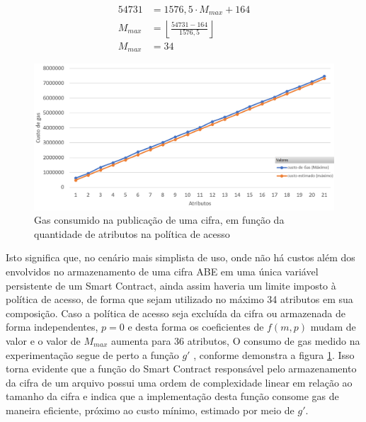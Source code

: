 \documentclass[a4paper,11pt]{article}
\begin{document}
\begin{equation}
  \begin{aligned}
    54731 & = 1576{,}5 \cdot M_{max} + 164 \\
    M_{max} & = \left\lfloor \frac{54731 - 164}{1576{,}5} \right\rfloor \\
    M_{max} & = 34
  \end{aligned}
\end{equation}

\begin{figure}[!h]
    \centering
    \includegraphics[width=\textwidth]{images/resultados-crescimento-custo-cifra.png}
    \caption{Gas consumido na publicação de uma cifra, em função da quantidade de atributos na política de acesso}
    \label{fig:custo-cifra}
\end{figure}

Isto significa que, no cenário mais simplista de uso, onde não há custos além dos envolvidos no armazenamento de uma cifra ABE em uma única variável persistente de um Smart Contract, ainda assim haveria um limite imposto à política de acesso, de forma que sejam utilizado no máximo 34 atributos em sua composição.
Caso a política de acesso seja excluída da cifra ou armazenada de forma independentes, $p = 0$ e desta forma os coeficientes de $f(m, p)$ mudam de valor e o valor de $M_{max}$ aumenta para 36 atributos,
O consumo de gas medido na experimentação segue de perto a função  $g'$ , conforme demonstra a figura \ref{fig:custo-cifra}.
Isso torna evidente que a função do Smart Contract responsável pelo armazenamento da cifra de um arquivo possui uma ordem de complexidade linear em relação ao tamanho da cifra e indica que a implementação desta função consome gas de maneira eficiente,  próximo ao custo mínimo, estimado por meio de $g'$.

\end{document}
